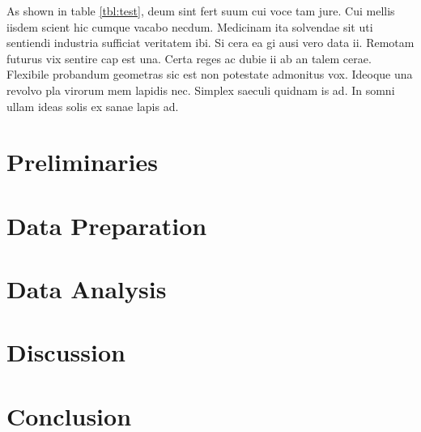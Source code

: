 \documentclass[12pt,a4paper,titlepage,oneside,english]{article}
\begin{document}
As shown in table \ref{tbl:test}, deum sint fert suum cui voce tam jure. Cui mellis iisdem scient hic cumque vacabo necdum. Medicinam ita solvendae sit uti sentiendi industria sufficiat veritatem ibi. Si cera ea gi ausi vero data ii. Remotam futurus vix sentire cap est una. Certa reges ac dubie ii ab an talem cerae. Flexibile probandum geometras sic est non potestate admonitus vox. Ideoque una revolvo pla virorum mem lapidis nec. Simplex saeculi quidnam is ad. In somni ullam ideas solis ex sanae lapis ad.



\section{Preliminaries}




\section{Data Preparation}



\section{Data Analysis}



\section{Discussion}




\section{Conclusion}




\newpage
\setcounter{page}{1}
\onehalfspacing
{}



\end{document}
